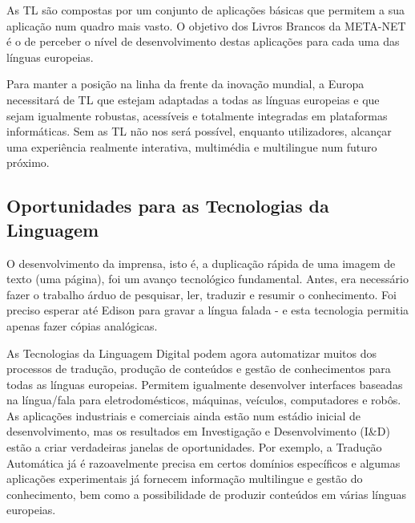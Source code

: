 \begin{multicols}{2}
As TL são compostas por um conjunto de aplicações básicas que permitem a sua aplicação num quadro mais vasto. O objetivo dos Livros Brancos da META-NET é o de perceber o nível de desenvolvimento destas aplicações para cada uma das línguas europeias.


Para manter a posição na linha da frente da inovação mundial, a Europa necessitará de TL que estejam adaptadas a todas as línguas europeias e que sejam igualmente robustas, acessíveis e totalmente integradas em plataformas informáticas. Sem as TL não nos será possível, enquanto utilizadores, alcançar uma experiência realmente interativa, multimédia e multilingue num futuro próximo.

\subsection{Oportunidades para as Tecnologias da Linguagem}

O desenvolvimento da imprensa, isto é, a duplicação rápida de uma imagem de texto (uma página), foi um avanço tecnológico fundamental. Antes, era necessário fazer o trabalho árduo de pesquisar, ler, traduzir e resumir o conhecimento. Foi preciso esperar até Edison para gravar a língua falada - e esta tecnologia permitia apenas fazer cópias analógicas.

As Tecnologias da Linguagem Digital podem agora automatizar muitos dos processos de tradução, produção de conteúdos e gestão de conhecimentos para todas as línguas europeias. Permitem igualmente desenvolver interfaces baseadas na língua/fala para eletrodomésticos, máquinas, veículos, computadores e robôs. As aplicações industriais e comerciais ainda estão num estádio inicial de desenvolvimento, mas os resultados em Investigação e Desenvolvimento (I\&D) estão a criar verdadeiras janelas de oportunidades. Por exemplo, a Tradução Automática já é razoavelmente precisa em certos domínios específicos e algumas aplicações experimentais já fornecem informação multilingue e gestão do conhecimento, bem como a possibilidade de produzir conteúdos em várias línguas europeias.


\end{multicols}
